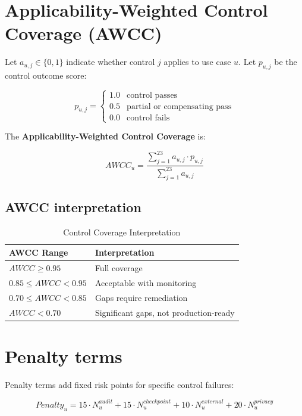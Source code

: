\section{Applicability-Weighted Control Coverage (AWCC)}

Let $a_{u,j} \in \{0,1\}$ indicate whether control $j$ applies to use case $u$.
Let $p_{u,j}$ be the control outcome score:

\[
p_{u,j} = \begin{cases}
1.0 & \text{control passes} \\
0.5 & \text{partial or compensating pass} \\
0.0 & \text{control fails}
\end{cases}
\]

The \textbf{Applicability-Weighted Control Coverage} is:

\begin{equation}
\boxed{
AWCC_u = \frac{\sum_{j=1}^{23} a_{u,j} \cdot p_{u,j}}{\sum_{j=1}^{23} a_{u,j}}
}
\label{eq:awcc}
\end{equation}

\subsection{AWCC interpretation}

\begin{table}[htbp]
\centering
\caption{Control Coverage Interpretation}
\begin{tabular}{l l}
\toprule
\textbf{AWCC Range} & \textbf{Interpretation} \\
\midrule
$AWCC \geq 0.95$ & Full coverage \\
$0.85 \leq AWCC < 0.95$ & Acceptable with monitoring \\
$0.70 \leq AWCC < 0.85$ & Gaps require remediation \\
$AWCC < 0.70$ & Significant gaps, not production-ready \\
\bottomrule
\end{tabular}
\end{table}

\section{Penalty terms}

Penalty terms add fixed risk points for specific control failures:

\begin{equation}
\boxed{
Penalty_u = 15 \cdot N^{audit}_u + 15 \cdot N^{checkpoint}_u + 10 \cdot N^{external}_u + 20 \cdot N^{privacy}_u
}
\label{eq:penalty}
\end{equation}

